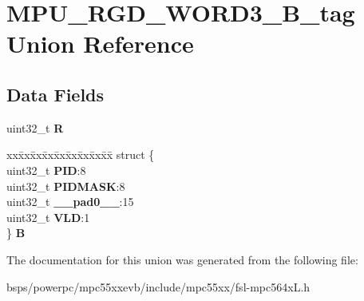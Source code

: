 \hypertarget{unionMPU__RGD__WORD3__32B__tag}{}\section{M\+P\+U\+\_\+\+R\+G\+D\+\_\+\+W\+O\+R\+D3\+\_\+B\+\_\+tag Union Reference}
\label{unionMPU__RGD__WORD3__32B__tag}
\subsection*{Data Fields}
\begin{DoxyCompactItemize}
\item 
\mbox{\label{unionMPU__RGD__WORD3__32B__tag_a7eda71976a3c3775291f18b45614094e}} 
uint32\+\_\+t {\bfseries R}
\item 
\mbox{\label{unionMPU__RGD__WORD3__32B__tag_a89e2067f6a9f879e08bdd517e2d3c709}} 
\begin{tabbing}
xx\=xx\=xx\=xx\=xx\=xx\=xx\=xx\=xx\=\kill
struct \{\\
\>uint32\_t {\bfseries PID}:8\\
\>uint32\_t {\bfseries PIDMASK}:8\\
\>uint32\_t {\bfseries \_\_pad0\_\_}:15\\
\>uint32\_t {\bfseries VLD}:1\\
\} {\bfseries B}\\

\end{tabbing}\end{DoxyCompactItemize}


The documentation for this union was generated from the following file\+:\begin{DoxyCompactItemize}
\item 
bsps/powerpc/mpc55xxevb/include/mpc55xx/fsl-\/mpc564x\+L.\+h\end{DoxyCompactItemize}
